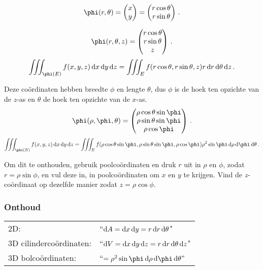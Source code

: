 \documentclass{2wa40summary}
\begin{document}
		\begin{voorbeeld}
			\[ 
				\phi (r,\theta) = \vvec{x \\ y} = \vvec {r \cos \theta \\ r \sin \theta} \,.
			 \]
		\end{voorbeeld}
		\begin{voorbeeld}
			\[ 
				\phi(r,\theta,z) = \vvec{r \cos \theta \\ r \sin \theta \\ z} \,.
			 \]
			 \[ 
				 \iiint_{\phi(E)} f(x,y,z) \d x \d y \d z = \iiint_E f (r \cos \theta, r \sin \theta , z) r \d r \d \theta \d z \,.
			  \]
		\end{voorbeeld}
		\begin{voorbeeld}
			Deze co\"ordinaten hebben breedte $\phi$ en lengte $\theta$, dus $\phi$ is de hoek ten opzichte van de $z$-as en $\theta$ de hoek ten opzichte van de $x$-as.
			\[ 
				\phi(\rho,\phi,\theta) = \vvec{\rho \cos \theta \sin \phi \\ \rho \sin \theta \sin \phi \\ \rho \cos \phi} \,.
			 \]
			 \[ 
				 \iiint_{\phi(E)} f(x,y,z) \d x \d y \d z = \iiint_E f(\rho \cos \theta \sin \phi , \rho \sin \theta \sin \phi , \rho \cos \phi) \rho^2 \sin \phi \d \rho \d \phi \d \theta \,.
			  \]

			Om dit te onthouden, gebruik poolco\"ordinaten en druk $r$ uit in $\rho$ en $\phi$, zodat $r=\rho \sin \phi$, en vul deze in, in poolco\"ordinaten om $x$ en $y$ te krijgen. Vind de $z$-co\"ordinaat op dezelfde manier zodat $z=\rho \cos \phi$.
			
		\end{voorbeeld}
		\subsubsection{Onthoud}
		\begin{tabular}{ll}
			2D: & ``$\mathop{}\!\mathrm{d} A = \mathop{}\!\mathrm{d} x \mathop{}\!\mathrm{d} y = r \mathop{}\!\mathrm{d} r \mathop{}\!\mathrm{d} \theta$" \\
			3D cilinderco\"ordinaten: & ``$\mathop{}\!\mathrm{d} V = \mathop{}\!\mathrm{d} x \mathop{}\!\mathrm{d} y \mathop{}\!\mathrm{d} z = r \mathop{}\!\mathrm{d} r \mathop{}\!\mathrm{d} \theta \mathop{}\!\mathrm{d} z $" \\
			3D bolco\"ordinaten: & ``$=\rho^2 \sin \phi \d \rho \d \phi \d \theta"$
		\end{tabular}
		
\end{document}
